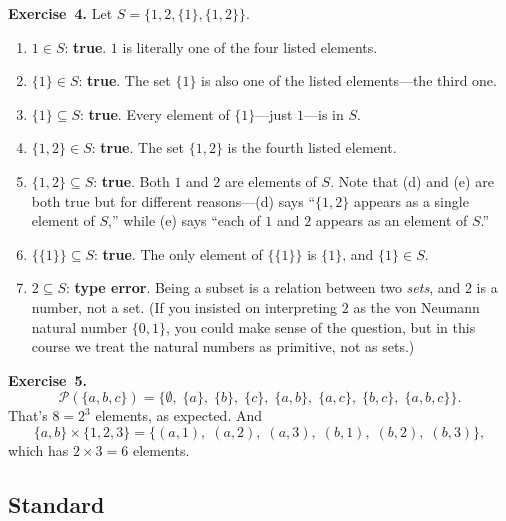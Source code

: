 \documentclass[11pt]{article}
\begin{document}
\medskip
\textbf{Exercise~4.}
Let $S = \{1, 2, \{1\}, \{1, 2\}\}$.
\begin{enumerate}[label=(\alph*)]
  \item $1 \in S$: \textbf{true}. $1$ is literally one of the four listed elements.
  \item $\{1\} \in S$: \textbf{true}. The set $\{1\}$ is also one of the listed elements---the third one.
  \item $\{1\} \subseteq S$: \textbf{true}. Every element of $\{1\}$---just $1$---is in $S$.
  \item $\{1, 2\} \in S$: \textbf{true}. The set $\{1, 2\}$ is the fourth listed element.
  \item $\{1, 2\} \subseteq S$: \textbf{true}. Both $1$ and $2$ are elements of $S$.
        Note that (d) and (e) are both true but for different reasons---(d) says ``$\{1,2\}$ appears as a single element of $S$,'' while (e) says ``each of $1$ and $2$ appears as an element of $S$.''
  \item $\{\{1\}\} \subseteq S$: \textbf{true}. The only element of $\{\{1\}\}$ is $\{1\}$, and $\{1\} \in S$.
  \item $2 \subseteq S$: \textbf{type error}. Being a subset is a relation between two \emph{sets}, and $2$ is a number, not a set. (If you insisted on interpreting $2$ as the von Neumann natural number $\{0, 1\}$, you could make sense of the question, but in this course we treat the natural numbers as primitive, not as sets.)
\end{enumerate}

\medskip
\textbf{Exercise~5.}
\[
  \mathcal{P}(\{a,b,c\}) = \bigl\{\emptyset,\; \{a\},\; \{b\},\; \{c\},\; \{a,b\},\; \{a,c\},\; \{b,c\},\; \{a,b,c\}\bigr\}.
\]
That's $8 = 2^3$ elements, as expected. And
\[
  \{a,b\} \times \{1,2,3\} = \bigl\{(a,1),\;(a,2),\;(a,3),\;(b,1),\;(b,2),\;(b,3)\bigr\},
\]
which has $2 \times 3 = 6$ elements.

\subsection*{Standard}
\end{document}
